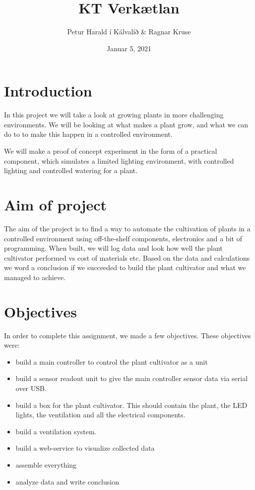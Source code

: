 \documentclass[a4paper,12pt,twoside,openright,titlepage]{book}
\title{KT Verkætlan}
\author{Petur Harald í Kálvalíð & Ragnar Kruse}
\date{Januar 5, 2021}
\begin{document}
\frontmatter
\maketitle

\cleardoublepage{}
\tableofcontents

\mainmatter

\chapter{Introduction}
In this project we will take a look at growing plants in more challenging environments. We will be looking at what makes a plant grow, and what we can do to to make this happen in a controlled environment.

We will make a proof of concept experiment in the form of a practical component, which simulates a limited lighting environment, with controlled lighting and controlled watering for a plant.

\chapter{Aim of project}
The aim of the project is to find a way to automate the cultivation of plants in a controlled environment using off-the-shelf components, electronics and a bit of programming. When built, we will log data and look how well the plant cultivator performed vs cost of materials etc.
Based on the data and calculations we word a conclusion if we succeeded to build the plant cultivator and what we managed to achieve.

\chapter{Objectives}
In order to complete this assignment, we made a few objectives.  These objectives were:

\begin{itemize}
\item build a main controller to control the plant cultivator as a unit
\item 
build a sensor readout unit to give the main controller sensor data via serial over USB.
\item 
build a box for the plant cultivator. This should contain the plant, the LED lights, the ventilation and all the electrical components.
\item 
build a ventilation system.
\item 
build a web-service to visualize collected data
\item 
assemble everything 
\item 
analyze data and write conclusion
\end{itemize}
\end{document}
